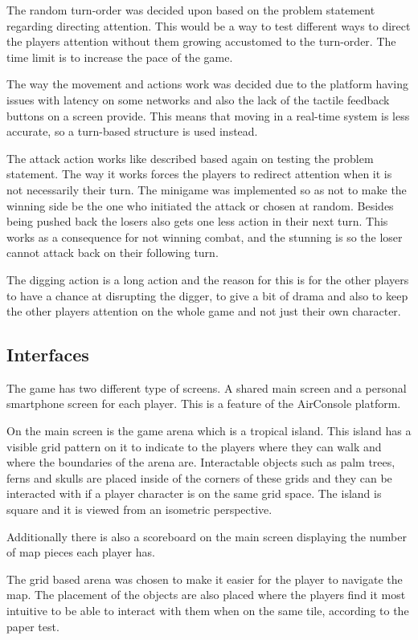 The random turn-order was decided upon based on the problem statement regarding directing attention. This would be a way to test different ways to direct the players attention without them growing accustomed to the turn-order. The time limit is to increase the pace of the game. 


The way the movement and actions work was decided due to the platform having issues with latency on some networks and also the lack of the tactile feedback buttons on a screen provide. This means that moving in a real-time system is less accurate, so a turn-based structure is used instead.


The attack action works like described based again on testing the problem statement. The way it works forces the players to redirect attention when it is not necessarily their turn. 
The minigame was implemented so as not to make the winning side be the one who initiated the attack or chosen at random. 
Besides being pushed back the losers also gets one less action in their next turn. This works as a consequence for not winning combat, and the stunning is so the loser cannot attack back on their following turn. 


The digging action is a long action and the reason for this is for the other players to have a chance at disrupting the digger, to give a bit of drama and also to keep the other players attention on the whole game and not just their own character. 



\subsection{Interfaces}
The game has two different type of screens. A shared main screen and a personal smartphone screen for each player. This is a feature of the AirConsole platform.

On the main screen is the game arena which is a tropical island. This island has a visible grid pattern on it to indicate to the players where they can walk and where the boundaries of the arena are. Interactable objects such as palm trees, ferns and skulls are placed inside of the corners of these grids and they can be interacted with if a player character is on the same grid space. The island is square and it is viewed from an isometric perspective. 

Additionally there is also a scoreboard on the main screen displaying the number of map pieces each player has.

The grid based arena was chosen to make it easier for the player to navigate the map. The placement of the objects are also placed where the players find it most intuitive to be able to interact with them when on the same tile, according to the paper test. 


